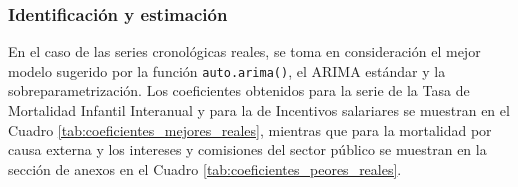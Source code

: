 \documentclass[
]{article}
\begin{document}
\subsubsection{Identificación y estimación}

En el caso de las series cronológicas reales, se toma en consideración
el mejor modelo sugerido por la función \texttt{auto.arima()}, el ARIMA
estándar y la sobreparametrización. Los coeficientes obtenidos para la
serie de la Tasa de Mortalidad Infantil Interanual y para la de
Incentivos salariares se muestran en el Cuadro
\ref{tab:coeficientes_mejores_reales}, mientras que para la mortalidad
por causa externa y los intereses y comisiones del sector público se
muestran en la sección de anexos en el Cuadro
\ref{tab:coeficientes_peores_reales}.

\begin{table}[H]


\end{table}
\end{document}
